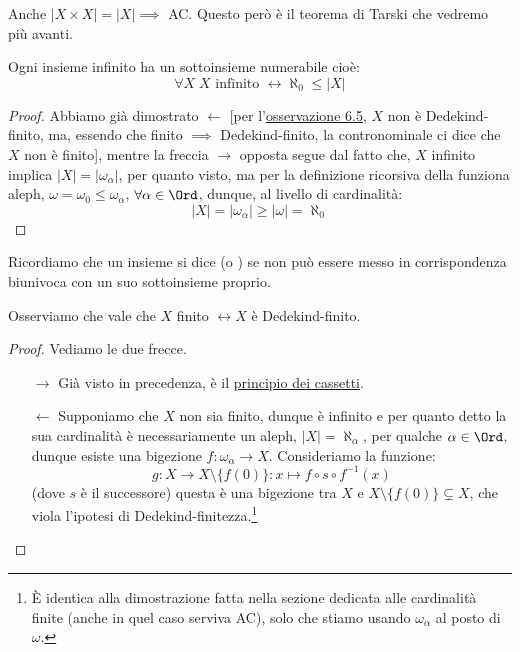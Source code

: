 \documentclass[11pt]{scrartcl}
\begin{document}
\begin{note}
	Anche $|X \times X| = |X| \implies$ AC. Questo però è il teorema di Tarski che vedremo più avanti.
\end{note}


\begin{corollary}
	Ogni insieme infinito ha un sottoinsieme numerabile cioè:
	\[ \forall X \; \text{$X$ infinito $\longleftrightarrow \aleph_0 \leq |X|$}
		\]
\end{corollary}

\begin{proof}
	Abbiamo già dimostrato $\leftarrow$ [per l'\hyperref[omega_Dedekind_finito]{osservazione 6.5}, $X$ non è Dedekind-finito, ma, essendo che finito $\implies$ Dedekind-finito,
	la contronominale ci dice che $X$ non è finito], mentre la freccia $\rightarrow$ opposta segue dal fatto che, $X$ infinito implica $|X| = |\omega_\alpha|$, per quanto visto,
	ma per la definizione ricorsiva della funziona aleph, $\omega = \omega_0 \leq \omega_\alpha$, $\forall \alpha \in \Ord$, dunque, al livello di cardinalità:
	\[ |X| = |\omega_\alpha| \geq |\omega| = \aleph_0
		\]
\end{proof}

Ricordiamo che un insieme si dice  (o ) se non può essere messo in corrispondenza biunivoca con un suo sottoinsieme proprio.

\begin{proposition}
	Osserviamo che vale che $X$ finito $\longleftrightarrow X$ è Dedekind-finito.
\end{proposition}

\begin{proof}
	Vediamo le due frecce.
	\begin{itemize}
		\item[$\boxed{\longrightarrow}$] Già visto in precedenza, è il \hyperref[cassetti]{principio dei cassetti}.
		\item[$\boxed{\longleftarrow}$] Supponiamo che $X$ non sia finito, dunque è infinito e per quanto detto la sua cardinalità è necessariamente un aleph, $|X| = \aleph_\alpha$, per qualche $\alpha \in \Ord$,
		dunque esiste una bigezione $f : \omega_\alpha \rightarrow X$. Consideriamo la funzione:
		\[ g : X \rightarrow X \setminus \{f(0)\} : x \mapsto f \circ s \circ f^{-1}(x)
			\]
		(dove $s$ è il successore) questa è una bigezione tra $X$ e $X \setminus \{f(0)\} \subsetneq X$, che viola l'ipotesi di Dedekind-finitezza.\footnote{È identica alla dimostrazione fatta nella sezione dedicata alle cardinalità finite (anche in quel caso serviva AC), solo che stiamo usando $\omega_\alpha$ al posto di $\omega$.}
	\end{itemize}
\end{proof}
\end{document}
